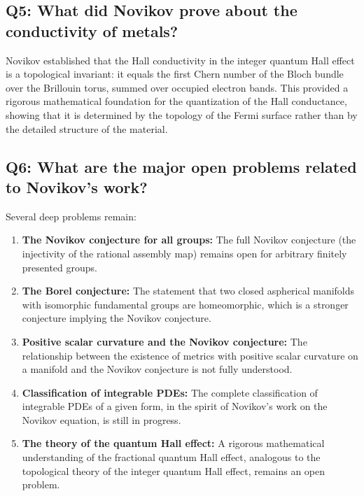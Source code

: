 \subsection*{Q5: What did Novikov prove about the conductivity of metals?}

Novikov established that the Hall conductivity in the integer quantum Hall effect is a topological invariant: it equals the first Chern number of the Bloch bundle over the Brillouin torus, summed over occupied electron bands. This provided a rigorous mathematical foundation for the quantization of the Hall conductance, showing that it is determined by the topology of the Fermi surface rather than by the detailed structure of the material.

\subsection*{Q6: What are the major open problems related to Novikov's work?}

Several deep problems remain:
\begin{enumerate}
    \item \textbf{The Novikov conjecture for all groups:} The full Novikov conjecture (the injectivity of the rational assembly map) remains open for arbitrary finitely presented groups.
    \item \textbf{The Borel conjecture:} The statement that two closed aspherical manifolds with isomorphic fundamental groups are homeomorphic, which is a stronger conjecture implying the Novikov conjecture.
    \item \textbf{Positive scalar curvature and the Novikov conjecture:} The relationship between the existence of metrics with positive scalar curvature on a manifold and the Novikov conjecture is not fully understood.
    \item \textbf{Classification of integrable PDEs:} The complete classification of integrable PDEs of a given form, in the spirit of Novikov's work on the Novikov equation, is still in progress.
    \item \textbf{The theory of the quantum Hall effect:} A rigorous mathematical understanding of the fractional quantum Hall effect, analogous to the topological theory of the integer quantum Hall effect, remains an open problem.
\end{enumerate}

